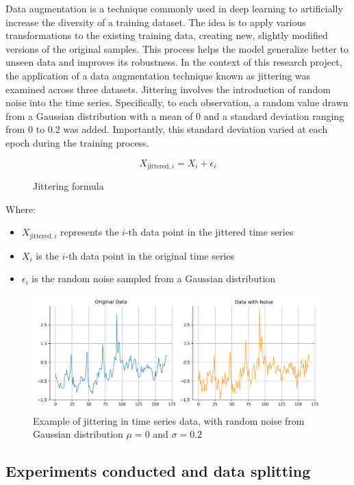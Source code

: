 Data augmentation is a technique commonly used in deep learning to artificially increase the diversity of a training dataset. The idea is to apply various transformations to the existing training data, creating new, slightly modified versions of the original samples. This process helps the model generalize better to unseen data and improves its robustness.
In the context of this research project, the application of a data augmentation technique known as jittering was examined across three datasets. Jittering involves the introduction of random noise into the time series. Specifically, to each observation, a random value drawn from a Gaussian distribution with a mean of 0 and a standard deviation ranging from 0 to 0.2 was added. Importantly, this standard deviation varied at each epoch during the training process.

\begin{figure}
\[X_{\text{jittered}, i} = X_i + \epsilon_i\]
\caption{Jittering formula}
\label{eq:jittering}
\end{figure}
Where: 
\begin{itemize}[noitemsep]
    \item $X_{\text{jittered}, i}$ represents the \(i\)-th data point in the jittered time series
    \item \(X_i\) is the \(i\)-th data point in the original time series
    \item \(\epsilon_i\) is the random noise sampled from a Gaussian distribution
\end{itemize}

\begin{figure}
    \centering
    \includegraphics[width=0.75\linewidth]{images/jittering.png}
    \caption{Example of jittering in time series data, with random noise from Gaussian distribution $\mu = 0$ and $\sigma = 0.2$}
    \label{fig:jittering}
\end{figure}

\subsection{Experiments conducted and data splitting}

